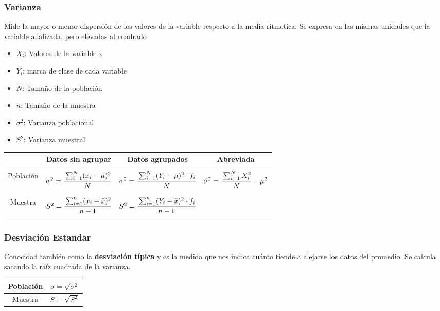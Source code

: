 \documentclass{article}
\begin{document}
        \subsubsection{Varianza }
            Mide la mayor o menor dispersión de los valores de la variable respecto a la media ritmetica. Se expresa en las mismas unidades que la variable analizada, pero elevadas al cuadrado
            \begin{multicols}{2}
                \begin{itemize}
                    \item $X_i$: Valores de la variable x
                    \item $Y_i$: marca de clase de cada variable
                    \item $N$: Tamaño de la población
                    \item $n$: Tamaño de la muestra
                    \item $\sigma^2$: Varianza poblacional
                    \item $S^2$: Varianza muestral
                \end{itemize}
            \end{multicols}
            \begin{table}[H]
                \centering
                \begin{tabular}{|c|c|c|c|}
                    \hline
                    & Datos sin agrupar & Datos agrupados & Abreviada \\ \hline &&&\\
                    Población & $\sigma^2 = \cfrac{\sum_{i=1}^{N}(x_i - \mu)^2}{N}$ &$\sigma^2 = \cfrac{\sum_{i=1}^{N}(Y_i - \mu)^2\cdot f_i}{N}$ & $\sigma^2= \cfrac{\sum_{i=1}^{N}X_i^2}{N} - \mu^2$ \\ &&&\\ \hline &&&\\
                    Muestra & $S^2 = \cfrac{\sum_{i=1}^{n}(x_i - \bar{x})^2}{n-1}$ & $S^2 = \cfrac{\sum_{i=1}^{n}(Y_i - \bar{x})^2\cdot f_i}{n-1}$ & \\ &&&\\\hline
                \end{tabular}
            \end{table}
        \subsubsection{Desviación Estandar}
            Conocidad también como la \textbf{desviación típica} y es la medida que nos indica cuánto tiende a alejarse los datos del promedio. Se calcula sacando la raíz cuadrada de la varianza.
            \begin{table}[H]
                \centering
                \begin{tabular}{|c|c|}
                    \hline
                    Población & $\sigma = \sqrt{\sigma^2}$ \\ \hline
                    Muestra & $S = \sqrt{S^2}$ \\ \hline
                \end{tabular}
            \end{table}
\end{document}
